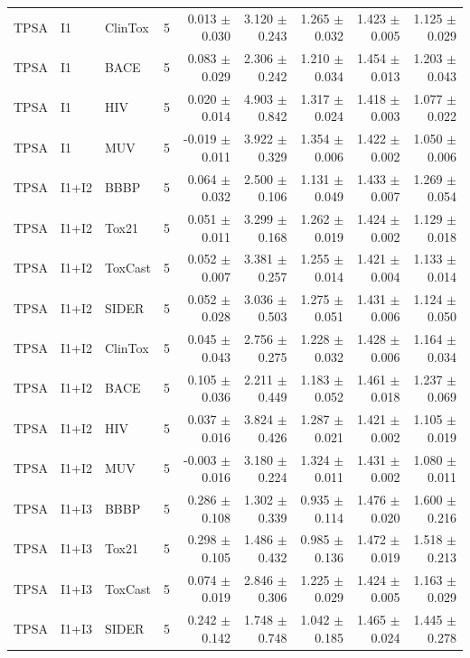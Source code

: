 \documentclass[journal=jcisd8,manuscript=article]{achemso}
\begin{document}
\begin{landscape}
\begin{longtable}{lllrrrrrr}
TPSA & I1 & ClinTox & 5 & 0.013 $\pm$ 0.030 & 3.120 $\pm$ 0.243 & 1.265 $\pm$ 0.032 & 1.423 $\pm$ 0.005 & 1.125 $\pm$ 0.029 \\
TPSA & I1 & BACE & 5 & 0.083 $\pm$ 0.029 & 2.306 $\pm$ 0.242 & 1.210 $\pm$ 0.034 & 1.454 $\pm$ 0.013 & 1.203 $\pm$ 0.043 \\
TPSA & I1 & HIV & 5 & 0.020 $\pm$ 0.014 & 4.903 $\pm$ 0.842 & 1.317 $\pm$ 0.024 & 1.418 $\pm$ 0.003 & 1.077 $\pm$ 0.022 \\
TPSA & I1 & MUV & 5 & -0.019 $\pm$ 0.011 & 3.922 $\pm$ 0.329 & 1.354 $\pm$ 0.006 & 1.422 $\pm$ 0.002 & 1.050 $\pm$ 0.006 \\
TPSA & I1+I2 & BBBP & 5 & 0.064 $\pm$ 0.032 & 2.500 $\pm$ 0.106 & 1.131 $\pm$ 0.049 & 1.433 $\pm$ 0.007 & 1.269 $\pm$ 0.054 \\
TPSA & I1+I2 & Tox21 & 5 & 0.051 $\pm$ 0.011 & 3.299 $\pm$ 0.168 & 1.262 $\pm$ 0.019 & 1.424 $\pm$ 0.002 & 1.129 $\pm$ 0.018 \\
TPSA & I1+I2 & ToxCast & 5 & 0.052 $\pm$ 0.007 & 3.381 $\pm$ 0.257 & 1.255 $\pm$ 0.014 & 1.421 $\pm$ 0.004 & 1.133 $\pm$ 0.014 \\
TPSA & I1+I2 & SIDER & 5 & 0.052 $\pm$ 0.028 & 3.036 $\pm$ 0.503 & 1.275 $\pm$ 0.051 & 1.431 $\pm$ 0.006 & 1.124 $\pm$ 0.050 \\
TPSA & I1+I2 & ClinTox & 5 & 0.045 $\pm$ 0.043 & 2.756 $\pm$ 0.275 & 1.228 $\pm$ 0.032 & 1.428 $\pm$ 0.006 & 1.164 $\pm$ 0.034 \\
TPSA & I1+I2 & BACE & 5 & 0.105 $\pm$ 0.036 & 2.211 $\pm$ 0.449 & 1.183 $\pm$ 0.052 & 1.461 $\pm$ 0.018 & 1.237 $\pm$ 0.069 \\
TPSA & I1+I2 & HIV & 5 & 0.037 $\pm$ 0.016 & 3.824 $\pm$ 0.426 & 1.287 $\pm$ 0.021 & 1.421 $\pm$ 0.002 & 1.105 $\pm$ 0.019 \\
TPSA & I1+I2 & MUV & 5 & -0.003 $\pm$ 0.016 & 3.180 $\pm$ 0.224 & 1.324 $\pm$ 0.011 & 1.431 $\pm$ 0.002 & 1.080 $\pm$ 0.011 \\
TPSA & I1+I3 & BBBP & 5 & 0.286 $\pm$ 0.108 & 1.302 $\pm$ 0.339 & 0.935 $\pm$ 0.114 & 1.476 $\pm$ 0.020 & 1.600 $\pm$ 0.216 \\
TPSA & I1+I3 & Tox21 & 5 & 0.298 $\pm$ 0.105 & 1.486 $\pm$ 0.432 & 0.985 $\pm$ 0.136 & 1.472 $\pm$ 0.019 & 1.518 $\pm$ 0.213 \\
TPSA & I1+I3 & ToxCast & 5 & 0.074 $\pm$ 0.019 & 2.846 $\pm$ 0.306 & 1.225 $\pm$ 0.029 & 1.424 $\pm$ 0.005 & 1.163 $\pm$ 0.029 \\
TPSA & I1+I3 & SIDER & 5 & 0.242 $\pm$ 0.142 & 1.748 $\pm$ 0.748 & 1.042 $\pm$ 0.185 & 1.465 $\pm$ 0.024 & 1.445 $\pm$ 0.278 \\

\end{longtable}
\end{landscape}
\end{document}
